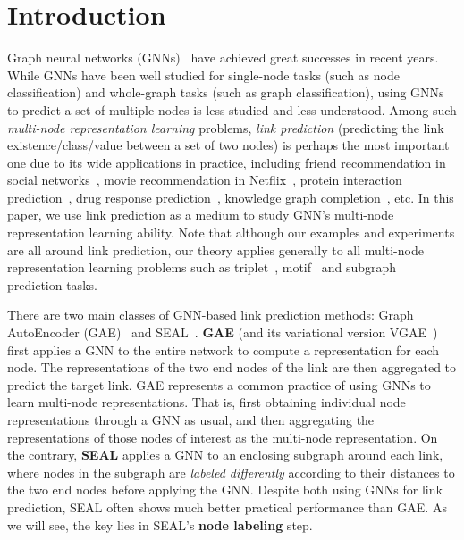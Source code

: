 \documentclass{article}
\begin{document}
\section{Introduction}
Graph neural networks (GNNs)~\citep{scarselli2009graph,bruna2013spectral,duvenaud2015convolutional,li2015gated,kipf2016semi,defferrard2016convolutional,dai2016discriminative,velivckovic2017graph,zhang2018end,ying2018hierarchical} have achieved great successes in recent years. While GNNs have been well studied for single-node tasks (such as node classification) and whole-graph tasks (such as graph classification), using GNNs to predict a set of multiple nodes is less studied and less understood. Among such \textit{multi-node representation learning} problems, \textit{link prediction} (predicting the link existence/class/value between a set of two nodes) is perhaps the most important one due to its wide applications in practice, including friend recommendation in social networks~\citep{adamic2003friends}, movie recommendation in Netflix~\citep{bennett2007netflix}, protein interaction prediction~\citep{qi2006evaluation}, drug response prediction~\citep{stanfield2017drug}, knowledge graph completion~\citep{nickel2015review}, etc.
In this paper, we use link prediction as a medium to study GNN's multi-node representation learning ability. Note that although our examples and experiments are all around link prediction, our theory applies generally to all multi-node representation learning problems such as triplet~\citep{liu2021neural}, motif~\citep{besta2021motif} and subgraph~\citep{alsentzer2020subgraph} prediction tasks.






There are two main classes of GNN-based link prediction methods: Graph AutoEncoder (GAE)~\citep{kipf2016variational} and SEAL~\citep{zhang2018link,li2020distance}.
\textbf{GAE} (and its variational version VGAE~\citep{kipf2016variational}) first applies a GNN to the entire network to compute a representation for each node. The representations of the two end nodes of the link are then aggregated to predict the target link. GAE represents a common practice of using GNNs to learn multi-node representations. That is, first obtaining individual node representations through a GNN as usual, and then aggregating the representations of those nodes of interest as the multi-node representation. On the contrary, \textbf{SEAL} applies a GNN to an enclosing subgraph around each link, where nodes in the subgraph are \textit{labeled differently} according to their distances to the two end nodes before applying the GNN. Despite both using GNNs for link prediction, SEAL often shows much better practical performance than GAE. As we will see, the key lies in SEAL's \textbf{node labeling} step.
\end{document}
